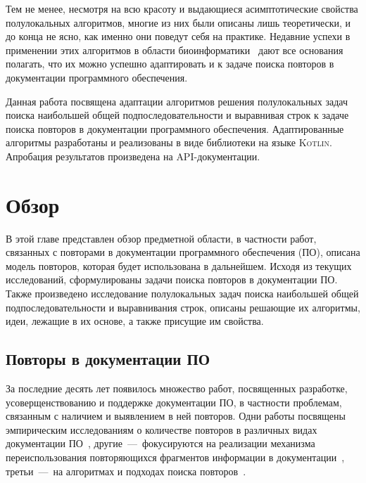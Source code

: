 Тем не менее, несмотря на всю красоту и выдающиеся асимптотические свойства полулокальных алгоритмов, многие из них были описаны лишь теоретически, и до конца не ясно, как именно они поведут себя на практике.
Недавние успехи в применении этих алгоритмов в области биоинформатики~\cite{baxter2012conserved,davies2015analysis, picot2010evolutionary} дают все основания полагать, что их можно успешно адаптировать и к задаче поиска повторов в документации программного обеспечения.

Данная работа посвящена адаптации алгоритмов решения полулокальных задач поиска наибольшей общей подпоследовательности и выравнивая строк к задаче поиска повторов в документации программного обеспечения.
Адаптированные алгоритмы разработаны и реализованы в виде библиотеки на языке \textsc{Kotlin}.
Апробация результатов произведена на {API}-документации.


\section{Обзор}
\label{sec:overview}
В этой главе представлен обзор предметной области, в частности работ, связанных с повторами в документации программного обеспечения (ПО), описана модель повторов, которая будет использована в дальнейшем. 
Исходя из текущих исследований, сформулированы задачи поиска повторов в документации ПО.
Также произведено исследование полулокальных задач поиска наибольшей общей подпоследовательности и выравнивания строк, описаны решающие их алгоритмы, %
идеи, лежащие в их основе, а также присущие им свойства.

\subsection{Повторы в документации ПО}\label{duplicateReport}

За последние десять лет появилось множество работ, посвященных разработке, усоверщенствованию и поддержке документации ПО, в частности проблемам, связанным с наличием и выявлением в ней повторов.
Одни работы посвящены эмпирическим исследованиям о количестве повторов  в различных видах документации ПО~\cite{poruban2016preliminary,juergens2010can,oumaziz2017documentation}, другие~---~фокусируются на реализации механизма переиспользования повторяющихся фрагментов информации в документации~\cite{koznov2015clone,horie2010tool,poruban2014reusable}, третьи~---~на алгоритмах и подходах поиска повторов~\cite{luciv2018detecting,luciv2019interactive,blasi2018replicomment,rago2016identifying, soto2015similarity}.

